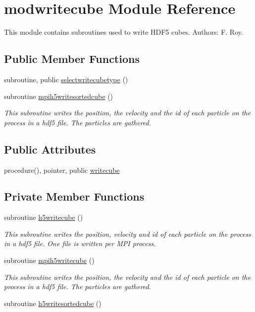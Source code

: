 \hypertarget{classmodwritecube}{\section{modwritecube Module Reference}
\label{classmodwritecube}
}


This module contains subroutines used to write H\-D\-F5 cubes. Authors\-: F. Roy.  


\subsection*{Public Member Functions}
\begin{DoxyCompactItemize}
\item 
subroutine, public \hyperlink{classmodwritecube_a9a2b869100e0425d256a5dda14a55d49}{selectwritecubetype} ()
\item 
subroutine \hyperlink{classmodwritecube_a491b7602123b1ac2d10637eb7c73ce77}{mpih5writesortedcube} ()
\begin{DoxyCompactList}\small\item\em This subroutine writes the position, the velocity and the id of each particle on the process in a hdf5 file. The particles are gathered. \end{DoxyCompactList}\end{DoxyCompactItemize}
\subsection*{Public Attributes}
\begin{DoxyCompactItemize}
\item 
procedure(), pointer, public \hyperlink{classmodwritecube_a72634b2d307b36dad9644259f46f9cce}{writecube}
\end{DoxyCompactItemize}
\subsection*{Private Member Functions}
\begin{DoxyCompactItemize}
\item 
subroutine \hyperlink{classmodwritecube_a99b5a6f7f4534196e666b125702c093f}{h5writecube} ()
\begin{DoxyCompactList}\small\item\em This subroutine writes the position, velocity and id of each particle on the process in a hdf5 file. One file is written per M\-P\-I process. \end{DoxyCompactList}\item 
subroutine \hyperlink{classmodwritecube_a0d94e39019f7808f3f373281ffe696a8}{mpih5writecube} ()
\begin{DoxyCompactList}\small\item\em This subroutine writes the position, the velocity and the id of each particle on the process in a hdf5 file. The particles are gathered. \end{DoxyCompactList}\item 
subroutine \hyperlink{classmodwritecube_a8af2220dcc73a35204f76527d4559e52}{h5writesortedcube} ()
\end{DoxyCompactItemize}



